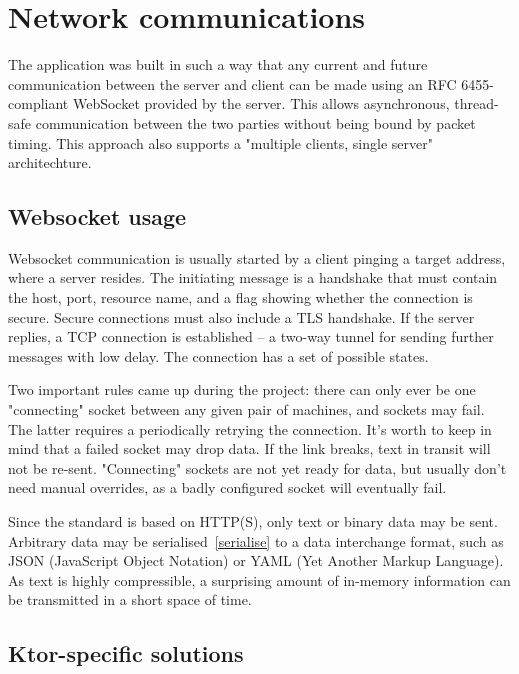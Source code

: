 \chapter{Network communications}
The application was built in such a way that any current and future communication between the server and client can be made using an RFC 6455-compliant\cite{RFC6455} WebSocket provided by the server. This allows asynchronous, thread-safe communication between the two parties without being bound by packet timing. This approach also supports a "multiple clients, single server" architechture.

\section{Websocket usage}
Websocket communication is usually started by a client pinging a target address, where a server resides. The initiating message is a handshake that must contain the host, port, resource name, and a flag showing whether the connection is secure. Secure connections must also include a TLS handshake. If the server replies, a TCP connection is established -- a two-way tunnel for sending further messages with low delay. The connection has a set of possible states.

Two important rules came up during the project: there can only ever be one "connecting" socket between any given pair of machines, and sockets may fail. The latter requires a periodically retrying the connection. It's worth to keep in mind that a failed socket may drop data. If the link breaks, text in transit will not be re-sent. "Connecting" sockets are not yet ready for data, but usually don't need manual overrides, as a badly configured socket will eventually fail.

Since the standard is based on HTTP(S), only text or binary data may be sent. Arbitrary data may be serialised~\ref{serialise} to a data interchange format, such as JSON (JavaScript Object Notation) or YAML (Yet Another Markup Language). As text is highly compressible, a surprising amount of in-memory information can be transmitted in a short space of time.

\section{Ktor-specific solutions}